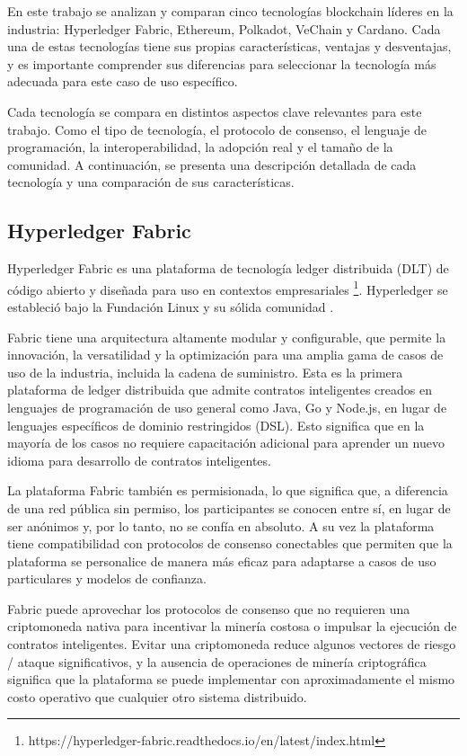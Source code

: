\documentclass[theoretical-framework.tex]{subfiles}
\begin{document}
En este trabajo se analizan y comparan cinco tecnologías blockchain líderes en la industria: Hyperledger Fabric, Ethereum, Polkadot, VeChain y Cardano. Cada una de estas tecnologías tiene sus propias características, ventajas y desventajas, y es importante comprender sus diferencias para seleccionar la tecnología más adecuada para este caso de uso específico.

Cada tecnología se compara en distintos aspectos clave relevantes para este trabajo. Como el tipo de tecnología, el protocolo de consenso, el lenguaje de programación, la interoperabilidad, la adopción real y el tamaño de la comunidad. A continuación, se presenta una descripción detallada de cada tecnología y una comparación de sus características.

\subsection{Hyperledger Fabric}

Hyperledger Fabric es una plataforma de tecnología ledger distribuida (DLT) de código abierto y diseñada para uso en contextos empresariales \footnote{https://hyperledger-fabric.readthedocs.io/en/latest/index.html}. Hyperledger se estableció bajo la Fundación Linux y su sólida comunidad \cite{androulaki2018hyperledger}. 

Fabric tiene una arquitectura altamente modular y configurable, que permite la innovación, la versatilidad y la optimización para una amplia gama de casos de uso de la industria, incluida la cadena de suministro. Esta es la primera plataforma de ledger distribuida que admite contratos inteligentes creados en lenguajes de programación de uso general como Java, Go y Node.js, en lugar de lenguajes específicos de dominio restringidos (DSL). Esto significa que en la mayoría de los casos no requiere capacitación adicional para aprender un nuevo idioma para desarrollo de contratos inteligentes.

La plataforma Fabric también es permisionada, lo que significa que, a diferencia de una red pública sin permiso, los participantes se conocen entre sí, en lugar de ser anónimos y, por lo tanto, no se confía en absoluto. A su vez la plataforma tiene compatibilidad con protocolos de consenso conectables que permiten que la plataforma se personalice de manera más eficaz para adaptarse a casos de uso particulares y modelos de confianza. 

Fabric puede aprovechar los protocolos de consenso que no requieren una criptomoneda nativa para incentivar la minería costosa o impulsar la ejecución de contratos inteligentes. Evitar una criptomoneda reduce algunos vectores de riesgo / ataque significativos, y la ausencia de operaciones de minería criptográfica significa que la plataforma se puede implementar con aproximadamente el mismo costo operativo que cualquier otro sistema distribuido.
\end{document}
